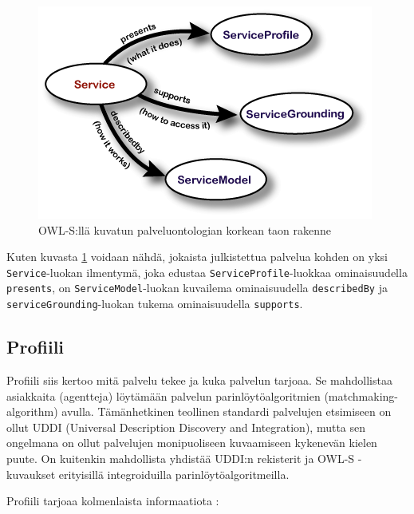 \documentclass[finnish]{tktltiki2}
\theoremstyle{definition}
\theoremstyle{remark}
\begin{document}
 \begin{figure}[ht]
 \centering
 \includegraphics[scale=0.60]{karkea_taso.png}
 \caption{OWL-S:llä kuvatun palveluontologian korkean taon rakenne \cite{OWLS}}
 \label{karkea_taso}
\end{figure}
 
 Kuten kuvasta \ref{karkea_taso}  voidaan nähdä, jokaista julkistettua palvelua kohden on yksi \texttt{Service}-luokan ilmentymä, joka edustaa \texttt{ServiceProfile}-luokkaa ominaisuudella \texttt{presents}, on \texttt{ServiceModel}-luokan kuvailema ominaisuudella \texttt{describedBy} ja \texttt{serviceGrounding}-luokan tukema ominaisuudella \texttt{supports}.


\subsection{Profiili}

Profiili siis kertoo mitä palvelu tekee ja kuka palvelun tarjoaa. Se mahdollistaa asiakkaita (agentteja) löytämään palvelun parinlöytöalgoritmien (matchmaking-algorithm) avulla. Tämänhetkinen teollinen standardi palvelujen etsimiseen on ollut UDDI (Universal Description Discovery and Integration), mutta sen ongelmana on ollut palvelujen monipuoliseen kuvaamiseen kykenevän kielen puute. On kuitenkin mahdollista yhdistää UDDI:n rekisterit ja OWL-S -kuvaukset erityisillä integroiduilla parinlöytöalgoritmeilla\cite{owls_approach}. 

Profiili tarjoaa kolmenlaista informaatiota \cite{OWLS}:
\end{document}
